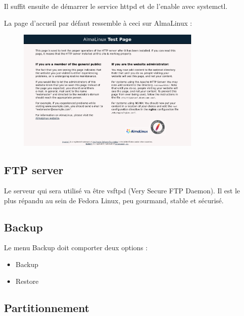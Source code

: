 \documentclass{article}
\begin{document}
	Il suffit ensuite de démarrer le service httpd et de l'enable avec systemctl.
	
	La page d'accueil par défaut ressemble à ceci sur AlmaLinux :
		\begin{figure}[h]
		\centering
		\includegraphics[width=0.8\textwidth]{webservdefault.png}
		
		\label{fig:your_label}
	\end{figure}
	
	
	
	
	
	
	
	
	
	
	
	
	
	
	
	
	
	
	\newpage
	
	
	\subsection{FTP server}
	Le serveur qui sera utilisé va être vsftpd (Very Secure FTP Daemon). Il est le plus répandu au sein de Fedora Linux, peu gourmand, stable et sécurisé.
	
	\subsection{Backup}
	Le menu Backup doit comporter deux options :
	\begin{itemize}
		\item Backup
		\item Restore
	\end{itemize}
	
	\newpage
	
	\subsection{Partitionnement}
	
\end{document}
